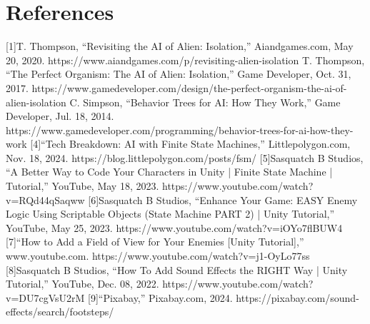 \documentclass{article}
\begin{document}
\section*{References}
[1]T. Thompson, “Revisiting the AI of Alien: Isolation,” Aiandgames.com, May 20, 2020. https://www.aiandgames.com/p/revisiting-alien-isolation
\newline
[2]T. Thompson, “The Perfect Organism: The AI of Alien: Isolation,” Game Developer, Oct. 31, 2017. https://www.gamedeveloper.com/design/the-perfect-organism-the-ai-of-alien-isolation
\newline
[3]C. Simpson, “Behavior Trees for AI: How They Work,” Game Developer, Jul. 18, 2014. https://www.gamedeveloper.com/programming/behavior-trees-for-ai-how-they-work
\newline
‌[4]“Tech Breakdown: AI with Finite State Machines,” Littlepolygon.com, Nov. 18, 2024. https://blog.littlepolygon.com/posts/fsm/
\newline
‌[5]Sasquatch B Studios, “A Better Way to Code Your Characters in Unity | Finite State Machine | Tutorial,” YouTube, May 18, 2023. https://www.youtube.com/watch?v=RQd44qSaqww
\newline
‌[6]Sasquatch B Studios, “Enhance Your Game: EASY Enemy Logic Using Scriptable Objects (State Machine PART 2) | Unity Tutorial,” YouTube, May 25, 2023. https://www.youtube.com/watch?v=iOYo7flBUW4
\newline
‌[7]“How to Add a Field of View for Your Enemies [Unity Tutorial],” www.youtube.com. https://www.youtube.com/watch?v=j1-OyLo77ss
\newline
‌[8]Sasquatch B Studios, “How To Add Sound Effects the RIGHT Way | Unity Tutorial,” YouTube, Dec. 08, 2022. https://www.youtube.com/watch?v=DU7cgVsU2rM
\newline
‌[9]“Pixabay,” Pixabay.com, 2024. https://pixabay.com/sound-effects/search/footsteps/
‌
\newpage
\glsaddall
\printglossary
\end{document}
